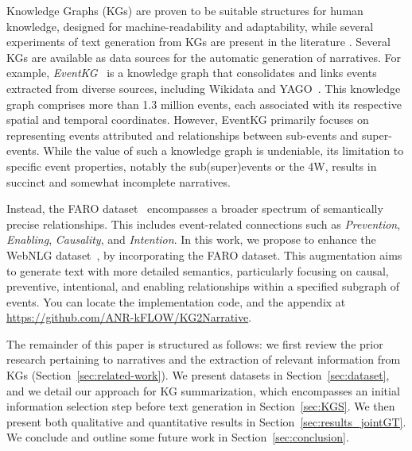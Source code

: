 \documentclass[
]{ceurart}
\begin{document}
Knowledge Graphs (KGs) are proven to be suitable structures for human knowledge, designed for machine-readability and adaptability, while several experiments of text generation from KGs are present in the literature \cite{KG_survey}. Several KGs are available as data sources for the automatic generation of narratives. For example, \textit{EventKG}~\cite{gottschalk2019eventkg} is a knowledge graph that consolidates and links events extracted from diverse sources, including Wikidata and YAGO~\cite{hoffart2013yago2}. This knowledge graph comprises more than 1.3 million events, each associated with its respective spatial and temporal coordinates. However, EventKG primarily focuses on representing events attributed and relationships between sub-events and super-events. While the value of such a knowledge graph is undeniable, its limitation to specific event properties, notably the sub(super)events or the 4W, results in succinct and somewhat incomplete narratives.

Instead, the FARO dataset~\cite{beyond_causality,sem_data_aug} encompasses a broader spectrum of semantically precise relationships. This includes event-related connections such as \textit{Prevention}, \textit{Enabling}, \textit{Causality}, and \textit{Intention}. In this work, we propose to enhance the WebNLG dataset~\cite{gardent-etal-2017-creating}, by incorporating the FARO dataset. This augmentation aims to generate text with more detailed semantics, particularly focusing on causal, preventive, intentional, and enabling relationships within a specified subgraph of events.
You can locate the implementation code, and the appendix at \url{https://github.com/ANR-kFLOW/KG2Narrative}.

The remainder of this paper is structured as follows: we first review the prior research pertaining to narratives and the extraction of relevant information from KGs (Section~\ref{sec:related-work}). We present datasets in Section~\ref{sec:dataset}, and we detail our approach for KG summarization, which encompasses an initial information selection step before text generation in Section~\ref{sec:KGS}. We then present both qualitative and quantitative results in Section~\ref{sec:results_jointGT}. We conclude and outline some future work in Section~\ref{sec:conclusion}.
\end{document}

